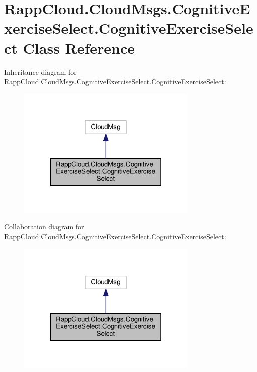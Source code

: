\hypertarget{classRappCloud_1_1CloudMsgs_1_1CognitiveExerciseSelect_1_1CognitiveExerciseSelect}{\section{Rapp\-Cloud.\-Cloud\-Msgs.\-Cognitive\-Exercise\-Select.\-Cognitive\-Exercise\-Select Class Reference}
\label{classRappCloud_1_1CloudMsgs_1_1CognitiveExerciseSelect_1_1CognitiveExerciseSelect}
}


Inheritance diagram for Rapp\-Cloud.\-Cloud\-Msgs.\-Cognitive\-Exercise\-Select.\-Cognitive\-Exercise\-Select\-:
\nopagebreak
\begin{figure}[H]
\begin{center}
\leavevmode
\includegraphics[width=244pt]{classRappCloud_1_1CloudMsgs_1_1CognitiveExerciseSelect_1_1CognitiveExerciseSelect__inherit__graph}
\end{center}
\end{figure}


Collaboration diagram for Rapp\-Cloud.\-Cloud\-Msgs.\-Cognitive\-Exercise\-Select.\-Cognitive\-Exercise\-Select\-:
\nopagebreak
\begin{figure}[H]
\begin{center}
\leavevmode
\includegraphics[width=244pt]{classRappCloud_1_1CloudMsgs_1_1CognitiveExerciseSelect_1_1CognitiveExerciseSelect__coll__graph}
\end{center}
\end{figure}
